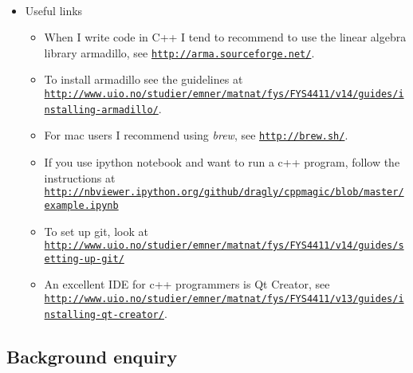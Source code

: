 \documentclass[%
twoside,                 %
final,                   %
10pt]{article}
\begin{document}
\paragraph{}
\begin{itemize}
\item Useful links
\begin{itemize}

 \item When I write code in C++ I tend to recommend to use the linear algebra library armadillo, see \href{{http://arma.sourceforge.net/}}{\nolinkurl{http://arma.sourceforge.net/}}. 

 \item To install armadillo see the guidelines at \href{{http://www.uio.no/studier/emner/matnat/fys/FYS4411/v14/guides/installing-armadillo/}}{\nolinkurl{http://www.uio.no/studier/emner/matnat/fys/FYS4411/v14/guides/installing-armadillo/}}. 

 \item For mac users I recommend using \emph{brew}, see \href{{http://brew.sh/}}{\nolinkurl{http://brew.sh/}}.

 \item If you use ipython notebook and want to run a c++ program, follow the instructions at \href{{http://nbviewer.ipython.org/github/dragly/cppmagic/blob/master/example.ipynb}}{\nolinkurl{http://nbviewer.ipython.org/github/dragly/cppmagic/blob/master/example.ipynb}}

 \item To set up git, look at \href{{http://www.uio.no/studier/emner/matnat/fys/FYS4411/v14/guides/setting-up-git/}}{\nolinkurl{http://www.uio.no/studier/emner/matnat/fys/FYS4411/v14/guides/setting-up-git/}}

 \item An excellent IDE for c++ programmers is Qt Creator, see \href{{http://www.uio.no/studier/emner/matnat/fys/FYS4411/v13/guides/installing-qt-creator/}}{\nolinkurl{http://www.uio.no/studier/emner/matnat/fys/FYS4411/v13/guides/installing-qt-creator/}}.
\end{itemize}

\noindent
\end{itemize}

\noindent





\subsection*{Background enquiry}
\end{document}
